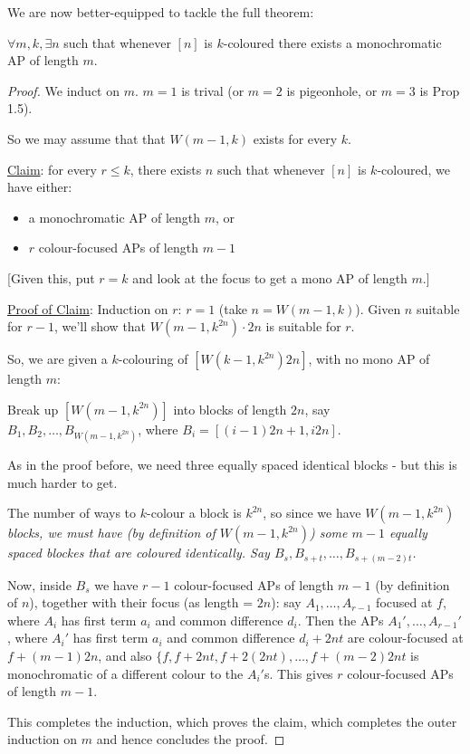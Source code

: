 \documentclass[10pt]{article}
\begin{document}
We are now better-equipped to tackle the full theorem:

\begin{theorem}
    $\forall m,k,\exists n$ such that whenever $[n]$ is $k$-coloured there exists a monochromatic AP of length $m$.
\end{theorem}
\begin{proof}
    We induct on $m$. $m=1$ is trival (or $m = 2$ is pigeonhole, or $m = 3$ is Prop 1.5).

    So we may assume that that $W(m-1,k)$ exists for every $k$.

    \underline{Claim}: for every $r\le k$, there exists $n$ such that whenever $[n]$ is $k$-coloured, we have either:
    \begin{itemize}
        \item a monochromatic AP of length $m$, or
        \item $r$ colour-focused APs of length $m-1$
    \end{itemize}
    [Given this, put $ r = k$ and look at the focus to get a mono AP of length $m$.]

    \underline{Proof of Claim}: Induction on $r$: $r = 1$ (take $n = W(m-1,k)$).
    Given $n$ suitable for $r-1$, we'll show that $W(m-1,k^{2n})\cdot 2n$ is suitable for $r$.

    So, we are given a $k$-colouring of $[W(k-1,k^{2n})2n]$, with no mono AP of length $m$:

    Break up $[W(m-1,k^{2n})]$ into blocks of length $2n$, say $B_1,B_2,\dots,B_{W(m-1,k^{2n})}$, where $B_i = [(i-1)2n+1,i2n]$.

    As in the proof before, we need three equally spaced identical blocks - but this is much harder to get.

    The number of ways to $k$-colour a block is $k^{2n}$, so since we have $W(m-1,k^{2n})$ \it{blocks}, we must have (by definition of $W(m-1,k^{2n})$) some  $m-1$ equally spaced blockes that are coloured identically. Say $B_s, B_{s+t},\dots,B_{s+(m-2)t}$.

    Now, inside $B_s$ we have $r-1$ colour-focused APs of length $m-1$ (by definition of $n$), together with their focus (as length = $2n$): say $A_1,\dots,A_{r-1}$ focused at $f$, where $A_i$ has first term $a_i$ and common difference $d_i$. Then the APs $A_1',\dots,A_{r-1}'$, where $A_i'$ has first term $a_i$ and common difference $d_i + 2nt$ are colour-focused at $f + (m-1)2n$, and also $\{f,f+2nt,f+2(2nt),\dots,f+(m-2)2nt$ is monochromatic of a different colour to the $A_i'$s. This gives $r$ colour-focused APs of length $m-1$.

    This completes the induction, which proves the claim, which completes the outer induction on $m$ and hence concludes the proof.
\end{proof}
\end{document}
